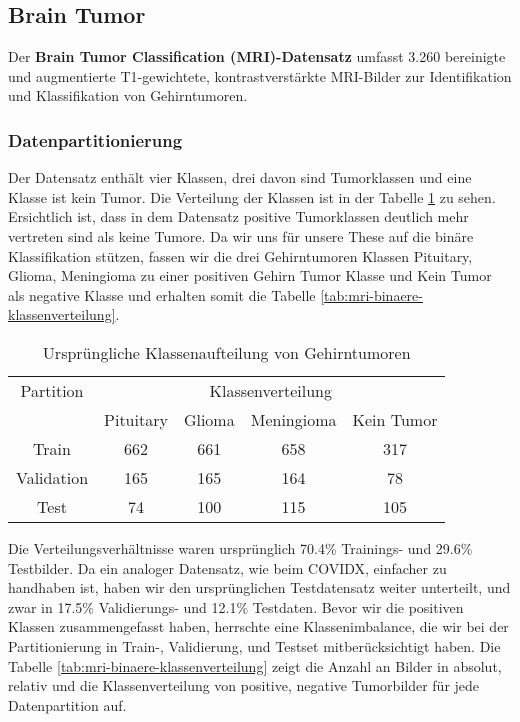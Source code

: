 \newpage
\subsection{Brain Tumor}
Der \textbf{Brain Tumor Classification (MRI)-Datensatz} \cite{bhuvaji_brain_2020} umfasst 3.260 bereinigte und augmentierte T1-gewichtete, kontrastverstärkte MRI-Bilder zur Identifikation und Klassifikation von Gehirntumoren.

\subsubsection{Datenpartitionierung}

Der Datensatz enthält vier Klassen, drei davon sind Tumorklassen und eine Klasse ist kein Tumor. Die Verteilung der Klassen ist in der Tabelle \ref{tab:mri-orginale-klassenverteilung} zu sehen. Ersichtlich ist, dass in dem Datensatz positive Tumorklassen deutlich mehr vertreten sind als keine Tumore. Da wir uns für unsere These auf die binäre Klassifikation stützen, fassen wir die drei Gehirntumoren Klassen Pituitary, Glioma, Meningioma zu einer positiven Gehirn Tumor Klasse und Kein Tumor als negative Klasse und erhalten somit die Tabelle \ref{tab:mri-binaere-klassenverteilung}.

\begin{table}[h]
\centering
\begin{tabular}{@{}ccccc@{}}
\toprule
 Partition & \multicolumn{4}{c}{Klassenverteilung}        \\ 
\cmidrule(l){2-5}
           & Pituitary & Glioma & Meningioma & Kein Tumor \\ 
\midrule 
Train      & 662 & 661 & 658 & 317 \\
Validation & 165 & 165 & 164 & 78  \\
Test       & 74  & 100 & 115 & 105 \\ 
\bottomrule
\end{tabular}
\caption{Ursprüngliche Klassenaufteilung von Gehirntumoren}
\label{tab:mri-orginale-klassenverteilung}
\end{table}

Die Verteilungsverhältnisse waren ursprünglich 70.4\% Trainings- und 29.6\% Testbilder. Da ein analoger Datensatz, wie beim COVIDX, einfacher zu handhaben ist, haben wir den ursprünglichen Testdatensatz weiter unterteilt, und zwar in 17.5\% Validierungs- und 12.1\% Testdaten. Bevor wir die positiven Klassen zusammengefasst haben, herrschte eine Klassenimbalance, die wir bei der Partitionierung in Train-, Validierung, und Testset mitberücksichtigt haben. Die Tabelle \ref{tab:mri-binaere-klassenverteilung} zeigt die Anzahl an Bilder in absolut, relativ und die Klassenverteilung von positive, negative Tumorbilder für jede Datenpartition auf.

